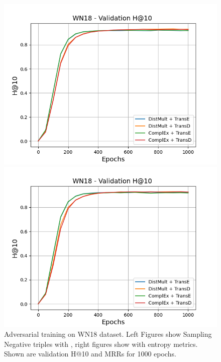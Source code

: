 \begin{figure}
\begin{minipage}{.5\textwidth}
    \end{minipage}
    \begin{minipage}{.5\textwidth}
      \centering
      \includegraphics[width=0.9\linewidth]{figures/results/gan_train/not_pretrained/random/wn18/random_wn18_hit10.png}
    \end{minipage}%
    \begin{minipage}{.5\textwidth}
      \centering
      \includegraphics[width=0.9\linewidth]{figures/results/gan_train/not_pretrained/uncertainty/max_distribution/entropy/wn18/uncertainty_wn18_hit10.png}
    \end{minipage}%
    \caption{Adversarial training on \textsc{WN18} dataset. 
    Left Figures show Sampling Negative triples with \origsampling, right figures show \ussoftmax with entropy metrics.
    Shown are validation H@10 and MRRs for 1000 epochs.}
    \label{fig:advtrain_wn18_random_vs_uncertainty}
\end{figure}





